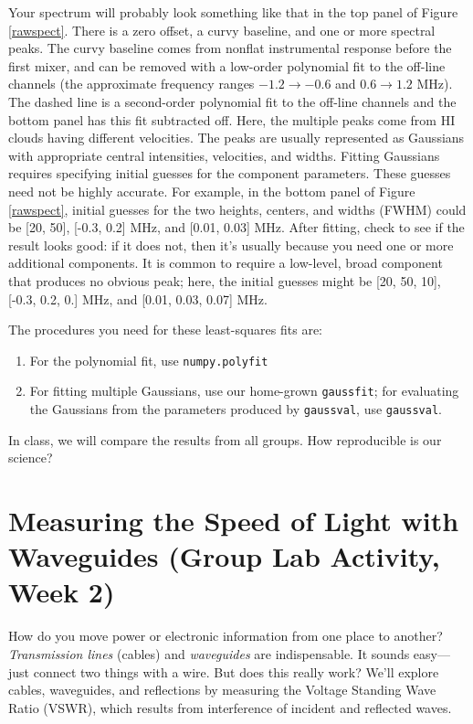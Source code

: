 \documentclass[11pt,preprint]{aastex}
\begin{document}
Your spectrum will probably look something like that in the top panel of
Figure \ref{rawspect}. There is a zero offset, a curvy baseline, and
one or more spectral peaks. The curvy baseline comes from nonflat
instrumental response before the first mixer, and can be removed with a
low-order polynomial fit to the off-line channels (the approximate
frequency ranges $-1.2 \rightarrow -0.6$ and $ 0.6 \rightarrow 1.2$
MHz). The dashed line is a second-order polynomial fit to the off-line
channels and the bottom panel has this fit subtracted off.  Here, the
multiple peaks come from HI clouds having different velocities. The
peaks are usually represented as Gaussians with appropriate central
intensities, velocities, and widths.  Fitting Gaussians requires
specifying initial guesses for the component parameters. These guesses
need not be highly accurate. For example, in the bottom panel of Figure
\ref{rawspect}, initial guesses for the two heights, centers, and widths
(FWHM) could be [20, 50], [-0.3, 0.2] MHz, and [0.01, 0.03] MHz.  After
fitting, check to see if the result looks good: if it does not, then
it's usually because you need one or more additional components. It is
common to require a low-level, broad component that produces no obvious
peak; here, the initial guesses might be [20, 50, 10], [-0.3, 0.2, 0.]
MHz, and [0.01, 0.03, 0.07] MHz. 

The procedures you need for these least-squares fits
are: \begin{enumerate}
\item For the polynomial fit, use {\tt numpy.polyfit}

\item For fitting multiple Gaussians, use our home-grown {\tt gaussfit}; for
  evaluating the Gaussians from the parameters produced by {\tt gaussval}, 
  use {\tt gaussval}.
\end{enumerate}

\noindent
In class, we will compare the results from all groups. How reproducible is
our science?

\section {Measuring the Speed of Light with Waveguides (Group Lab Activity, Week 2)}
\label{expt}

\noindent
How do you move power or electronic information from one place to
another? {\it Transmission lines} (cables) and {\it waveguides} are
indispensable. It sounds easy---just connect two things with a wire. But
does this really work? We'll explore cables, waveguides, and reflections
by measuring the Voltage Standing Wave Ratio (VSWR), which results from
interference of incident and reflected waves.
\end{document}
